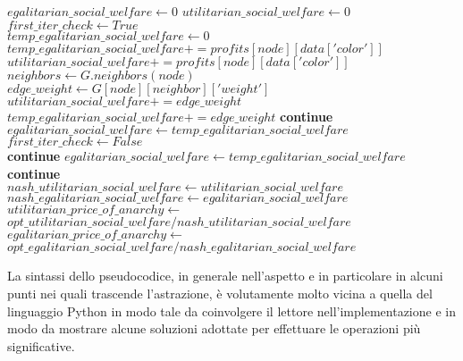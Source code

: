 \begin{algorithmic}
	\State $egalitarian\_social\_welfare\gets 0$
	\State $utilitarian\_social\_welfare\gets 0$
	\State $first\_iter\_check\gets True$ \\

		\State $temp\_egalitarian\_social\_welfare\gets 0$
		\State $temp\_egalitarian\_social\_welfare += profits[node][data['color']]$
		\State $utilitarian\_social\_welfare += profits[node][data['color']]$
		\State $neighbors\gets G.neighbors(node)$
				\State $edge\_weight\gets G[node][neighbor]['weight']$
				\State $utilitarian\_social\_welfare += edge\_weight$
				\State $temp\_egalitarian\_social\_welfare += edge\_weight$
			\Else
				\State \textbf{continue}
			\EndIf
				\State $egalitarian\_social\_welfare\gets temp\_egalitarian\_social\_welfare$
				\State $first\_iter\_check\gets False$ \\
				\State \textbf{continue}
			\EndIf
				\State $egalitarian\_social\_welfare\gets temp\_egalitarian\_social\_welfare$
			\Else
				\State \textbf{continue}
			\EndIf
		\EndFor
	\EndFor \\

	\State $nash\_utilitarian\_social\_welfare\gets utilitarian\_social\_welfare$
	\State $nash\_egalitarian\_social\_welfare\gets egalitarian\_social\_welfare$ \\

		\State $utilitarian\_price\_of\_anarchy\gets$ \\
		$opt\_utilitarian\_social\_welfare / nash\_utilitarian\_social\_welfare$
	\EndIf
		\State $egalitarian\_price\_of\_anarchy\gets$ \\
		$opt\_egalitarian\_social\_welfare / nash\_egalitarian\_social\_welfare$
	\EndIf \\
\EndIf

\end{algorithmic}

La sintassi dello pseudocodice, in generale nell'aspetto e in particolare in alcuni punti nei quali trascende l'astrazione, è volutamente molto vicina a quella del linguaggio Python in modo tale da coinvolgere il lettore nell'implementazione e in modo da mostrare alcune soluzioni adottate per effettuare le operazioni più significative.\\

